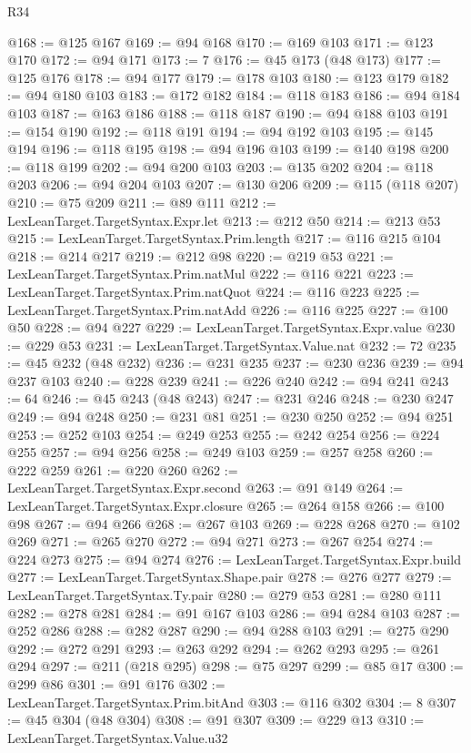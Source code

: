\begin{lexlean}{R34}
\begin{coremodule}
@168 := @125 @167
@169 := @94 @168
@170 := @169 @103
@171 := @123 @170
@172 := @94 @171
@173 := 7
@176 := @45 @173 (@48 @173)
@177 := @125 @176
@178 := @94 @177
@179 := @178 @103
@180 := @123 @179
@182 := @94 @180 @103
@183 := @172 @182
@184 := @118 @183
@186 := @94 @184 @103
@187 := @163 @186
@188 := @118 @187
@190 := @94 @188 @103
@191 := @154 @190
@192 := @118 @191
@194 := @94 @192 @103
@195 := @145 @194
@196 := @118 @195
@198 := @94 @196 @103
@199 := @140 @198
@200 := @118 @199
@202 := @94 @200 @103
@203 := @135 @202
@204 := @118 @203
@206 := @94 @204 @103
@207 := @130 @206
@209 := @115 (@118 @207)
@210 := @75 @209
@211 := @89 @111
@212 := LexLeanTarget.TargetSyntax.Expr.let
@213 := @212 @50
@214 := @213 @53
@215 := LexLeanTarget.TargetSyntax.Prim.length
@217 := @116 @215 @104
@218 := @214 @217
@219 := @212 @98
@220 := @219 @53
@221 := LexLeanTarget.TargetSyntax.Prim.natMul
@222 := @116 @221
@223 := LexLeanTarget.TargetSyntax.Prim.natQuot
@224 := @116 @223
@225 := LexLeanTarget.TargetSyntax.Prim.natAdd
@226 := @116 @225
@227 := @100 @50
@228 := @94 @227
@229 := LexLeanTarget.TargetSyntax.Expr.value
@230 := @229 @53
@231 := LexLeanTarget.TargetSyntax.Value.nat
@232 := 72
@235 := @45 @232 (@48 @232)
@236 := @231 @235
@237 := @230 @236
@239 := @94 @237 @103
@240 := @228 @239
@241 := @226 @240
@242 := @94 @241
@243 := 64
@246 := @45 @243 (@48 @243)
@247 := @231 @246
@248 := @230 @247
@249 := @94 @248
@250 := @231 @81
@251 := @230 @250
@252 := @94 @251
@253 := @252 @103
@254 := @249 @253
@255 := @242 @254
@256 := @224 @255
@257 := @94 @256
@258 := @249 @103
@259 := @257 @258
@260 := @222 @259
@261 := @220 @260
@262 := LexLeanTarget.TargetSyntax.Expr.second
@263 := @91 @149
@264 := LexLeanTarget.TargetSyntax.Expr.closure
@265 := @264 @158
@266 := @100 @98
@267 := @94 @266
@268 := @267 @103
@269 := @228 @268
@270 := @102 @269
@271 := @265 @270
@272 := @94 @271
@273 := @267 @254
@274 := @224 @273
@275 := @94 @274
@276 := LexLeanTarget.TargetSyntax.Expr.build
@277 := LexLeanTarget.TargetSyntax.Shape.pair
@278 := @276 @277
@279 := LexLeanTarget.TargetSyntax.Ty.pair
@280 := @279 @53
@281 := @280 @111
@282 := @278 @281
@284 := @91 @167 @103
@286 := @94 @284 @103
@287 := @252 @286
@288 := @282 @287
@290 := @94 @288 @103
@291 := @275 @290
@292 := @272 @291
@293 := @263 @292
@294 := @262 @293
@295 := @261 @294
@297 := @211 (@218 @295)
@298 := @75 @297
@299 := @85 @17
@300 := @299 @86
@301 := @91 @176
@302 := LexLeanTarget.TargetSyntax.Prim.bitAnd
@303 := @116 @302
@304 := 8
@307 := @45 @304 (@48 @304)
@308 := @91 @307
@309 := @229 @13
@310 := LexLeanTarget.TargetSyntax.Value.u32

\end{coremodule}
\end{lexlean}
